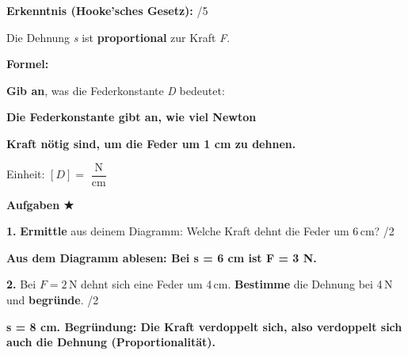 \documentclass[10pt,a4paper]{article}
\newcommand{\lsg}[1]{\textcolor{loesung}{\textbf{#1}}}
\newcommand{\punkte}[1]{\hfill\textcolor{grau}{\small/#1}}
\newcommand{\stern}[1]{\textcolor{physik}{\textbf{#1}}}
\newcommand{\fv}[1]{\textit{#1}}
\newcommand{\op}[1]{\textbf{#1}}
\begin{document}
\textbf{\textcolor{physik}{Erkenntnis (Hooke'sches Gesetz):}} \punkte{5}

\vspace{1mm}

\begin{minipage}[t]{0.48\textwidth}
Die Dehnung \fv{s} ist \lsg{proportional} zur Kraft \fv{F}.

\vspace{3mm}

\textbf{Formel:} \fbox{\;\Large $\fv{F} = $ \lsg{$\fv{D} \cdot \fv{s}$}\;\;}
\end{minipage}
\hfill
\begin{minipage}[t]{0.48\textwidth}
\op{Gib an}, was die Federkonstante \fv{D} bedeutet:

\vspace{2mm}

\lsg{Die Federkonstante gibt an, wie viel Newton}

\lsg{Kraft nötig sind, um die Feder um 1 cm zu dehnen.}

\vspace{2mm}

Einheit: $[\fv{D}] = $ \lsg{$\dfrac{\text{N}}{\text{cm}}$}
\end{minipage}

\newpage

\textbf{\textcolor{physik}{Aufgaben \stern{★}}}

\vspace{3mm}

\textbf{1.} \op{Ermittle} aus deinem Diagramm: Welche Kraft dehnt die Feder um 6\,cm? \punkte{2}

\vspace{2mm}

\lsg{Aus dem Diagramm ablesen: Bei s = 6 cm ist F = 3 N.}

\vspace{4mm}

\textbf{2.} Bei $\fv{F} = 2$\,N dehnt sich eine Feder um 4\,cm. \op{Bestimme} die Dehnung bei 4\,N und \op{begründe}. \punkte{2}

\vspace{2mm}

\lsg{s = 8 cm. Begründung: Die Kraft verdoppelt sich, also verdoppelt sich auch die Dehnung (Proportionalität).}

\vspace{4mm}
\end{document}
